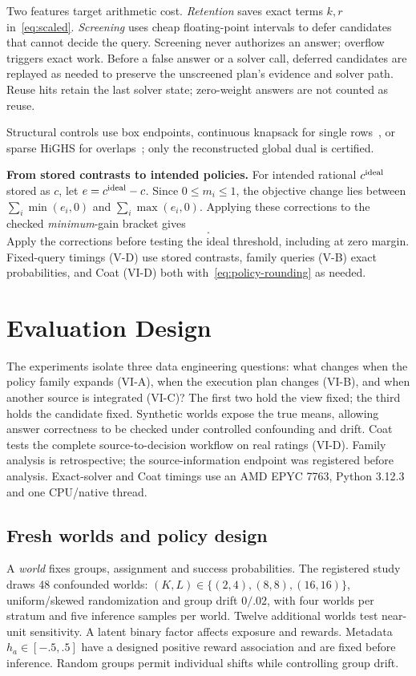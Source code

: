\documentclass[conference]{IEEEtran}
\begin{document}
Two features target arithmetic cost. \emph{Retention} saves exact terms $k,r$ in~\eqref{eq:scaled}. \emph{Screening} uses cheap floating-point intervals to defer candidates that cannot decide the query. Screening never authorizes an answer; overflow triggers exact work. Before a false answer or a solver call, deferred candidates are replayed as needed to preserve the unscreened plan's evidence and solver path. Reuse hits retain the last solver state; zero-weight answers are not counted as reuse. 

Structural controls use box endpoints, continuous knapsack for single rows~\cite{martello1990knapsack}, or sparse HiGHS for overlaps~\cite{huangfu2018highs}; only the reconstructed global dual is certified.

\textbf{From stored contrasts to intended policies.} For intended rational $c^{\rm ideal}$ stored as $c$, let $e=c^{\rm ideal}-c$. Since $0\le m_i\le1$, the objective change lies between $\sum_i\min(e_i,0)$ and $\sum_i\max(e_i,0)$. Applying these corrections to the checked \emph{minimum}-gain bracket gives
\begin{equation}
 [L+\sum_i\min(e_i,0),\ U+\sum_i\max(e_i,0)].\label{eq:policy-rounding}
\end{equation}
Apply the corrections before testing the ideal threshold, including at zero margin. Fixed-query timings (V-D) use stored contrasts, family queries (V-B) exact probabilities, and Coat (VI-D) both with~\eqref{eq:policy-rounding} as needed.



\section{Evaluation Design}\label{sec:design}
The experiments isolate three data engineering questions: what changes when the policy family expands (VI-A), when the execution plan changes (VI-B), and when another source is integrated (VI-C)? The first two hold the view fixed; the third holds the candidate fixed. Synthetic worlds expose the true means, allowing answer correctness to be checked under controlled confounding and drift. Coat tests the complete source-to-decision workflow on real ratings (VI-D). Family analysis is retrospective; the source-information endpoint was registered before analysis. Exact-solver and Coat timings use an AMD EPYC 7763, Python 3.12.3 and one CPU/native thread.

\subsection{Fresh worlds and policy design}
A \emph{world} fixes groups, assignment and success probabilities. The registered study draws 48 confounded worlds: $(K,L)\in\{(2,4),(8,8),(16,16)\}$, uniform/skewed randomization and group drift $0/.02$, with four worlds per stratum and five inference samples per world. Twelve additional worlds test near-unit sensitivity. A latent binary factor affects exposure and rewards. Metadata $h_a\in[-.5,.5]$ have a designed positive reward association and are fixed before inference. Random groups permit individual shifts while controlling group drift.
\end{document}
